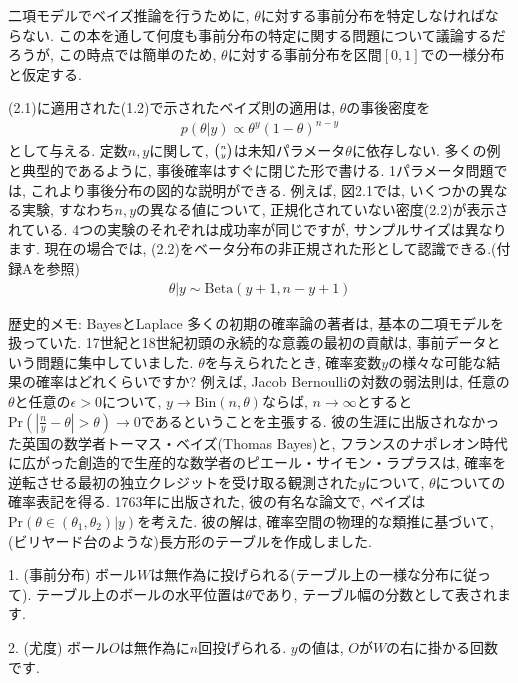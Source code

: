 \documentclass[10pt,dvipdfmx,a4]{beamer}
\newcommand{\eq}[1]{\begin{align}#1\end{align}}
\begin{document}

\begin{frame}
二項モデルでベイズ推論を行うために, $\theta$に対する事前分布を特定しなければならない.
この本を通して何度も事前分布の特定に関する問題について議論するだろうが, この時点では簡単のため, $\theta$に対する事前分布を区間$[0,1]$での一様分布と仮定する.

(2.1)に適用された(1.2)で示されたベイズ則の適用は, $\theta$の事後密度を
\eq{p(\theta|y)\propto \theta^y(1-\theta)^{n-y}}
として与える.
定数$n, y$に関して, ${\tiny\begin{pmatrix}n\\y\end{pmatrix}}$は未知パラメータ$\theta$に依存しない.
多くの例と典型的であるように, 事後確率はすぐに閉じた形で書ける.
1パラメータ問題では, これより事後分布の図的な説明ができる.
例えば, 図2.1では, いくつかの異なる実験, すなわち$n, y$の異なる値について, 正規化されていない密度(2.2)が表示されている.
4つの実験のそれぞれは成功率が同じですが, サンプルサイズは異なります.
現在の場合では, (2.2)をベータ分布の非正規された形として認識できる.(付録Aを参照)
\eq{\theta|y\sim \text{Beta}(y+1,n-y+1)}
\end{frame}


\begin{frame}{歴史的メモ: BayesとLaplace}
多くの初期の確率論の著者は, 基本の二項モデルを扱っていた.
17世紀と18世紀初頭の永続的な意義の最初の貢献は, 事前データという問題に集中していました.
$\theta$を与えられたとき, 確率変数$y$の様々な可能な結果の確率はどれくらいですか?
例えば, Jacob Bernoulliの対数の弱法則は, 任意の$\theta$と任意の$\epsilon>0$について, $y\rightarrow \text{Bin}(n,\theta)$ならば, $n\rightarrow\infty$とすると$\text{Pr}(|\tfrac{n}{y}-\theta|>\theta)\rightarrow 0$であるということを主張する.
彼の生涯に出版されなかった英国の数学者トーマス・ベイズ(Thomas Bayes)と, フランスのナポレオン時代に広がった創造的で生産的な数学者のピエール・サイモン・ラプラスは, 確率を逆転させる最初の独立クレジットを受け取る観測された$y$について, $\theta$についての確率表記を得る.
1763年に出版された, 彼の有名な論文で, ベイズは$\text{Pr}(\theta\in(\theta_1,\theta_2)|y)$を考えた.
彼の解は, 確率空間の物理的な類推に基づいて, (ビリヤード台のような)長方形のテーブルを作成しました.

1. (事前分布) ボール$W$は無作為に投げられる(テーブル上の一様な分布に従って).
テーブル上のボールの水平位置は$\theta$であり, テーブル幅の分数として表されます.

2. (尤度) ボール$O$は無作為に$n$回投げられる.
$y$の値は, $O$が$W$の右に掛かる回数です.
\end{frame}
\end{document}
